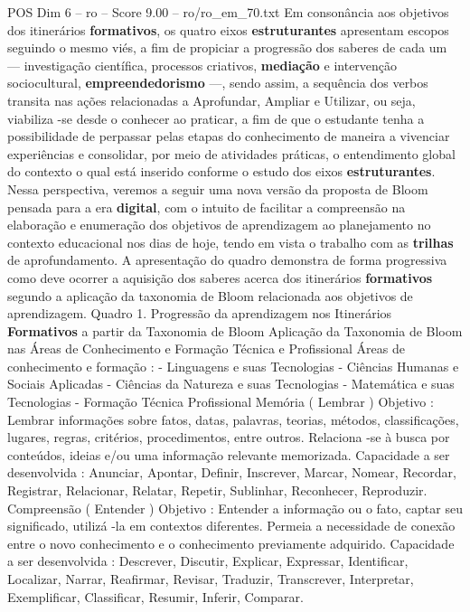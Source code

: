 \begin{textsample}{POS Dim 6 – ro – Score 9.00 – ro/ro\_em\_70.txt}
Em consonância aos objetivos dos itinerários \textbf{formativos}, os quatro eixos \textbf{estruturantes} apresentam escopos seguindo o mesmo viés, a fim de propiciar a progressão dos saberes de cada um — investigação científica, processos criativos, \textbf{mediação} e intervenção sociocultural, \textbf{empreendedorismo} —, sendo assim, a sequência dos verbos transita nas ações relacionadas a Aprofundar, Ampliar e Utilizar, ou seja, viabiliza -se desde o conhecer ao praticar, a fim de que o estudante tenha a possibilidade de perpassar pelas etapas do conhecimento de maneira a vivenciar experiências e consolidar, por meio de atividades práticas, o entendimento global do contexto o qual está inserido conforme o estudo dos eixos \textbf{estruturantes}.
Nessa perspectiva, veremos a seguir uma nova versão da proposta de Bloom pensada para a era \textbf{digital}, com o intuito de facilitar a compreensão na elaboração e enumeração dos objetivos de aprendizagem ao planejamento no contexto educacional nos dias de hoje, tendo em vista o trabalho com as \textbf{trilhas} de aprofundamento.
A apresentação do quadro demonstra de forma progressiva como deve ocorrer a aquisição dos saberes acerca dos itinerários \textbf{formativos} segundo a aplicação da taxonomia de Bloom relacionada aos objetivos de aprendizagem.
Quadro 1.
Progressão da aprendizagem nos Itinerários \textbf{Formativos} a partir da Taxonomia de Bloom Aplicação da Taxonomia de Bloom nas Áreas de Conhecimento e Formação Técnica e Profissional Áreas de conhecimento e formação : - Linguagens e suas Tecnologias - Ciências Humanas e Sociais Aplicadas - Ciências da Natureza e suas Tecnologias - Matemática e suas Tecnologias - Formação Técnica Profissional Memória ( Lembrar ) Objetivo : Lembrar informações sobre fatos, datas, palavras, teorias, métodos, classificações, lugares, regras, critérios, procedimentos, entre outros.
Relaciona -se à busca por conteúdos, ideias e/ou uma informação relevante memorizada.
Capacidade a ser desenvolvida : Anunciar, Apontar, Definir, Inscrever, Marcar, Nomear, Recordar, Registrar, Relacionar, Relatar, Repetir, Sublinhar, Reconhecer, Reproduzir.
Compreensão ( Entender ) Objetivo : Entender a informação ou o fato, captar seu significado, utilizá -la em contextos diferentes.
Permeia a necessidade de conexão entre o novo conhecimento e o conhecimento previamente adquirido.
Capacidade a ser desenvolvida : Descrever, Discutir, Explicar, Expressar, Identificar, Localizar, Narrar, Reafirmar, Revisar, Traduzir, Transcrever, Interpretar, Exemplificar, Classificar, Resumir, Inferir, Comparar.

\end{textsample}
